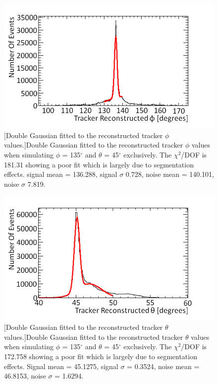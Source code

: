 \begin{figure}[!h]
\centering
\begin{minipage}{.45\textwidth}
  \centering
  \includegraphics[width=\linewidth]{Chapter6/Figs/Raster/phiFittedNewProportionsMedText.png}
  [Double Gaussian fitted to the reconstructed tracker $\phi$ values.]{Double Gaussian fitted to the reconstructed tracker $\phi$ values when simulating $\phi$ = 135$^\circ$ and $\theta$ = 45$^\circ$ exclusively. The $\chi^2$/DOF is 181.31 showing a poor fit which is largely due to segmentation effects. signal mean = 136.288, signal $\sigma$ 0.728, noise mean = 140.101, noise $\sigma$ 7.819.} 
  \label{fig:fittingPhiWithDead}
\end{minipage}%
\qquad
\begin{minipage}{.45\textwidth}
  \centering
  \includegraphics[width=\linewidth]{Chapter6/Figs/Raster/thetaFittedNewProportionsMedText.png}
  [Double Gaussian fitted to the reconstructed tracker $\theta$ values.]{Double Gaussian fitted to the reconstructed tracker $\theta$ values when simulating $\phi$ = 135$^\circ$ and $\theta$ = 45$^\circ$ exclusively. The $\chi^2$/DOF is 172.758 showing a poor fit which is largely due to segmentation effects. Signal mean = 45.1275, signal $\sigma$ = 0.3524, noise mean = 46.8153, noise $\sigma$ = 1.6294.}
  \label{fig:fittingThetaWithDead}
\end{minipage}
\end{figure}


